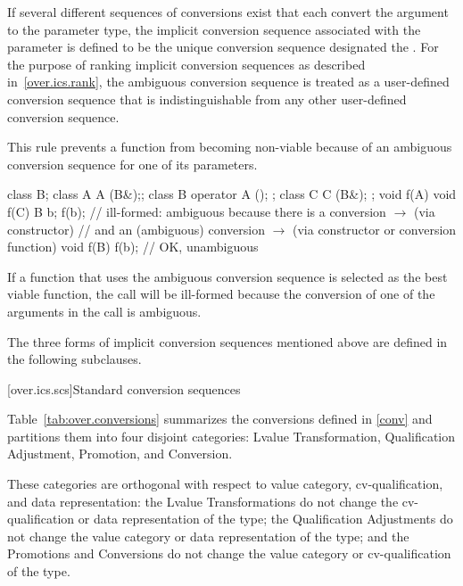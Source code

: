 \pnum
If several different sequences of conversions exist that each
convert the argument to the parameter type, the implicit
conversion sequence associated with the parameter is defined to be
the unique conversion sequence designated the
.
For the purpose of ranking implicit conversion sequences as described
in~\ref{over.ics.rank}, the ambiguous conversion sequence is treated
as a user-defined conversion sequence that is indistinguishable from any
other user-defined conversion sequence.
\begin{note}
This rule prevents a function from becoming non-viable because of an ambiguous
conversion sequence for one of its parameters.
\begin{example}
\begin{codeblock}
class B;
class A { A (B&);};
class B { operator A (); };
class C { C (B&); };
void f(A) { }
void f(C) { }
B b;
f(b);               // ill-formed: ambiguous because there is a conversion  $\to$  (via constructor)
                    // and an (ambiguous) conversion  $\to$  (via constructor or conversion function)
void f(B) { }
f(b);               // OK, unambiguous
\end{codeblock}
\end{example}
\end{note}
If a function that uses the ambiguous conversion sequence is selected
as the best viable function, the call will be ill-formed because the conversion
of one of the arguments in the call is ambiguous.

\pnum
The three forms of implicit conversion sequences mentioned above
are defined in the following subclauses.

[over.ics.scs]{Standard conversion sequences}

\pnum
Table~\ref{tab:over.conversions}
summarizes the conversions defined in \ref{conv} and
partitions them into four disjoint categories: Lvalue Transformation,
Qualification Adjustment, Promotion, and Conversion.
\begin{note}
These categories are orthogonal with respect to value category,
cv-qualification, and data representation: the Lvalue Transformations
do not change the cv-qualification or data
representation of the type; the Qualification Adjustments do not
change the value category or data representation of the type; and
the Promotions and Conversions do not change the
value category or cv-qualification of the type.
\end{note}

